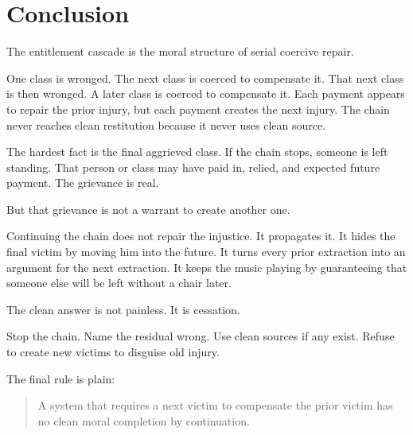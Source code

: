 \documentclass[12pt]{article}
\begin{document}
\section{Conclusion}

The entitlement cascade is the moral structure of serial coercive repair.

One class is wronged. The next class is coerced to compensate it. That next class is then wronged. A later class is coerced to compensate it. Each payment appears to repair the prior injury, but each payment creates the next injury. The chain never reaches clean restitution because it never uses clean source.

The hardest fact is the final aggrieved class. If the chain stops, someone is left standing. That person or class may have paid in, relied, and expected future payment. The grievance is real.

But that grievance is not a warrant to create another one.

Continuing the chain does not repair the injustice. It propagates it. It hides the final victim by moving him into the future. It turns every prior extraction into an argument for the next extraction. It keeps the music playing by guaranteeing that someone else will be left without a chair later.

The clean answer is not painless. It is cessation.

Stop the chain. Name the residual wrong. Use clean sources if any exist. Refuse to create new victims to disguise old injury.

The final rule is plain:

\begin{quote}
A system that requires a next victim to compensate the prior victim has no clean moral completion by continuation.
\end{quote}
\end{document}
